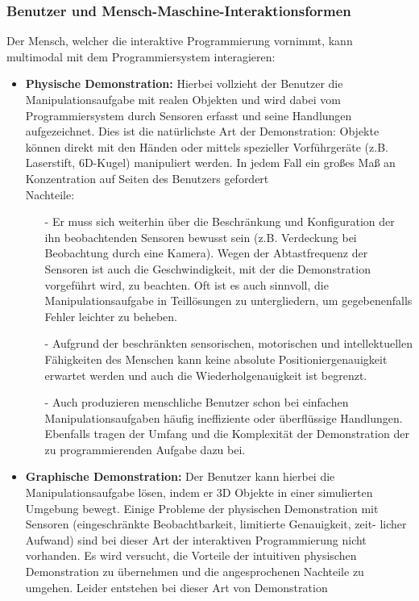 \subsubsection*{Benutzer und Mensch-Maschine-Interaktionsformen}
Der Mensch, welcher die interaktive Programmierung vornimmt, kann multimodal mit dem Programmiersystem interagieren:
\begin{itemize}
\item \textbf{Physische Demonstration:}
Hierbei vollzieht der Benutzer die Manipulationsaufgabe mit realen Objekten und wird dabei
vom Programmiersystem durch Sensoren erfasst und seine Handlungen aufgezeichnet. 
Dies ist die natürlichste Art der Demonstration: Objekte können direkt mit den Händen 
oder mittels spezieller Vorführgeräte (z.B. Laserstift, 6D-Kugel) manipuliert werden. 
In jedem Fall ein großes Maß an Konzentration auf Seiten des Benutzers gefordert\\
Nachteile: 
\begin{itemize}
\item[-]Er muss sich weiterhin über die Beschränkung und Konfiguration der ihn beobachtenden Sensoren bewusst sein
(z.B. Verdeckung bei Beobachtung durch eine Kamera). Wegen der Abtastfrequenz der Sensoren
ist auch die Geschwindigkeit, mit der die Demonstration vorgeführt wird, zu beachten.
Oft ist es auch sinnvoll, die Manipulationsaufgabe in Teillösungen zu untergliedern, um
gegebenenfalls Fehler leichter zu beheben.
\item[-] Aufgrund der beschränkten sensorischen,
motorischen und intellektuellen Fähigkeiten des Menschen kann keine absolute 
Positioniergenauigkeit erwartet werden und auch die Wiederholgenauigkeit ist begrenzt.
\item[-] Auch produzieren menschliche Benutzer schon bei einfachen Manipulationsaufgaben häufig ineffiziente
oder überflüssige Handlungen. Ebenfalls tragen der Umfang und die Komplexität der Demonstration
der zu programmierenden Aufgabe dazu bei.
\end{itemize}
\item \textbf{Graphische Demonstration:} 
Der Benutzer kann hierbei die Manipulationsaufgabe lösen,
indem er 3D Objekte in einer simulierten Umgebung bewegt. Einige Probleme der physischen
Demonstration mit Sensoren (eingeschränkte Beobachtbarkeit, limitierte Genauigkeit, zeit-
licher Aufwand) sind bei dieser Art der interaktiven Programmierung nicht vorhanden. Es
wird versucht, die Vorteile der intuitiven physischen Demonstration zu übernehmen und
die angesprochenen Nachteile zu umgehen. Leider entstehen bei dieser Art von Demonstration

\end{itemize}
